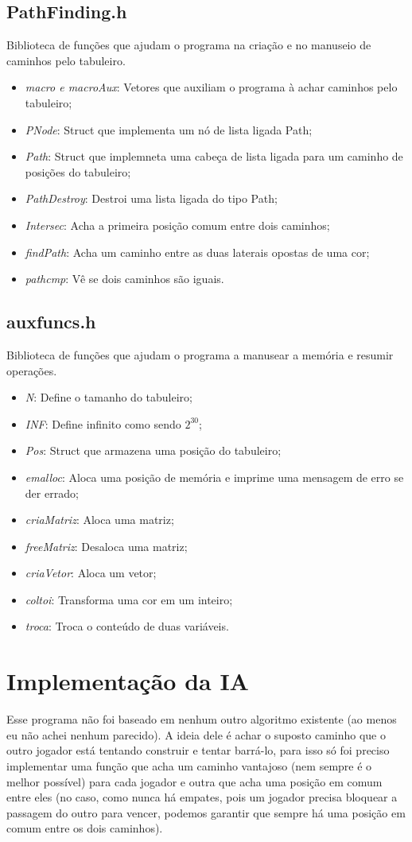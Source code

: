 \documentclass[12pt, a4paper]{article} %
\begin{document}
	\subsection{PathFinding.h}
	Biblioteca de funções que ajudam o programa na criação e no manuseio de
caminhos pelo tabuleiro.
	\begin{itemize}
		\item \textit{macro e macroAux}: Vetores que auxiliam o programa à achar caminhos pelo tabuleiro;
		\item \textit{PNode}: Struct que implementa um nó de lista ligada Path;
		\item \textit{Path}: Struct que implemneta uma cabeça de lista ligada para um caminho de posições do tabuleiro;
		\item \textit{PathDestroy}: Destroi uma lista ligada do tipo Path;
		\item \textit{Intersec}: Acha a primeira posição comum entre dois caminhos;
		\item \textit{findPath}: Acha um caminho entre as duas laterais opostas de uma cor;
		\item \textit{pathcmp}: Vê se dois caminhos são iguais.
	\end{itemize}
	\subsection{auxfuncs.h}
	Biblioteca de funções que ajudam o programa a manusear a memória e
resumir operações.
	\begin{itemize}
		\item \textit{N}: Define o tamanho do tabuleiro;
		\item \textit{INF}: Define infinito como sendo $2^{30}$;
		\item \textit{Pos}: Struct que armazena uma posição do tabuleiro;
		\item \textit{emalloc}: Aloca uma posição de memória e imprime uma mensagem de erro se der errado;
		\item \textit{criaMatriz}: Aloca uma matriz;
		\item \textit{freeMatriz}: Desaloca uma matriz;
		\item \textit{criaVetor}: Aloca um vetor;
		\item \textit{coltoi}: Transforma uma cor em um inteiro;
		\item \textit{troca}: Troca o conteúdo de duas variáveis.
	\end{itemize}

\section{Implementação da IA}
	\par Esse programa não foi baseado em nenhum outro algoritmo existente (ao menos eu não achei nenhum parecido). A ideia dele é achar o suposto caminho que o outro jogador está tentando construir e tentar barrá-lo, para isso só foi preciso implementar uma função que acha um caminho vantajoso (nem sempre é o melhor possível) para cada jogador e outra que acha uma posição em comum entre eles (no caso, como nunca há empates, pois um jogador precisa bloquear a passagem do outro para vencer, podemos garantir que sempre há uma posição em comum entre os dois caminhos).
\end{document}

